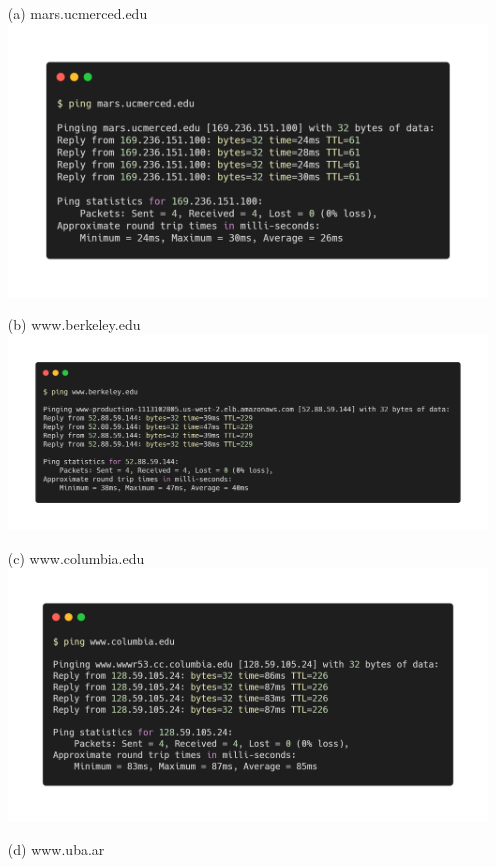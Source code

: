 \documentclass[a4paper]{article}
\begin{document}
\begin{itemize}
	\item[(a)] mars.ucmerced.edu \\
	\includegraphics[scale=0.3]{ping-mars.png}
	\item[(b)] www.berkeley.edu \\
	\includegraphics[scale=0.2]{ping-berkeley.png} 
	\item[(c)] www.columbia.edu \\
	\includegraphics[scale=0.3]{ping-columbia.png} 
	\item[(d)] www.uba.ar \\

\end{itemize}
\end{document}
